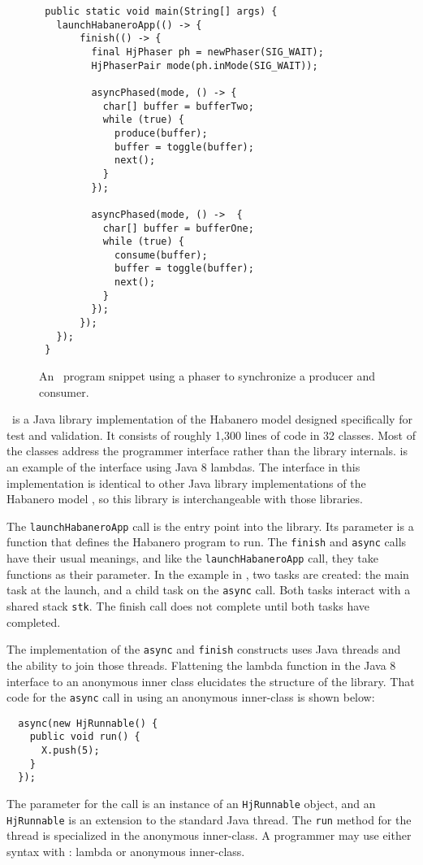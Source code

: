 \begin{figure}
  \begin{center}
    \begin{lstlisting}
 public static void main(String[] args) {
   launchHabaneroApp(() -> {
       finish(() -> {
         final HjPhaser ph = newPhaser(SIG_WAIT);
         HjPhaserPair mode(ph.inMode(SIG_WAIT));
         
         asyncPhased(mode, () -> {
           char[] buffer = bufferTwo;
           while (true) {
             produce(buffer);
             buffer = toggle(buffer);
             next();
           }                                
         });

         asyncPhased(mode, () ->  {
           char[] buffer = bufferOne;
           while (true) {
             consume(buffer);
             buffer = toggle(buffer);
             next();
           }
         });
       });
   });
 }
    \end{lstlisting}

  \end{center}
  \caption{An \hj\ program snippet using a phaser to synchronize a producer and consumer.}
  \label{fig:hj-phaser}
\end{figure}

\hjv\ is a Java library implementation of the Habanero model designed
specifically for test and validation. It consists of roughly 1,300
lines of code in 32 classes. Most of the classes address the
programmer interface rather than the library
internals.  is an example of the interface
using Java 8 lambdas. The interface in this
implementation is identical to other Java library implementations of
the Habanero model \cite{hj-lib}, so this library is interchangeable
with those libraries.

The \texttt{launchHabaneroApp} call is the entry point into the
library. Its parameter is a function that defines the Habanero program
to run.  The \texttt{finish} and \texttt{async} calls have their usual
meanings, and like the \texttt{launchHabaneroApp} call, they take
functions as their parameter. In the example in , two tasks are created:
the main task at the launch, and a child task on the \texttt{async}
call. Both tasks interact with a shared stack \texttt{stk}. The finish
call does not complete until both tasks have completed.

The implementation of the \texttt{async} and \texttt{finish}
constructs uses Java threads and the ability to join those
threads. Flattening the lambda function in the Java 8 interface to an anonymous inner class elucidates the
structure of the library. That code for the \texttt{async} call in
 using an anonymous inner-class is shown below:
\begin{lstlisting}
  async(new HjRunnable() {
    public void run() {
      X.push(5);
    }
  });
\end{lstlisting}
The parameter for the call is an instance of an \texttt{HjRunnable}
object, and an \texttt{HjRunnable} is an extension to the standard Java
thread. The \texttt{run} method for the thread is specialized in the
anonymous inner-class. A programmer may use either syntax with \hjv: lambda or anonymous inner-class. 

